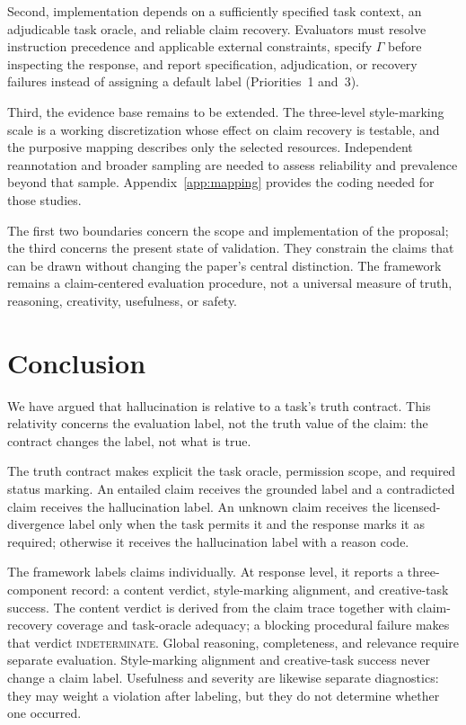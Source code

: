 \documentclass{clv2025}
\begin{document}
Second, implementation depends on a sufficiently specified task context, an
adjudicable task oracle, and reliable claim recovery. Evaluators must resolve
instruction precedence and applicable external constraints, specify $\Gamma$
before inspecting the response, and report specification, adjudication, or
recovery failures instead of assigning a default label (Priorities~1 and~3).

Third, the evidence base remains to be extended. The three-level style-marking
scale is a working discretization whose effect on claim recovery is testable,
and the purposive mapping describes only the selected resources. Independent
reannotation and broader sampling are needed to assess reliability and
prevalence beyond that sample. Appendix~\ref{app:mapping} provides the coding
needed for those studies.

The first two boundaries concern the scope and implementation of the proposal;
the third concerns the present state of validation. They constrain the claims
that can be drawn without changing the paper's central distinction. The
framework remains a claim-centered evaluation procedure, not a universal
measure of truth, reasoning, creativity, usefulness, or safety.


\section{Conclusion}\label{sec:conclusion}

We have argued that hallucination is relative to a task's truth contract.
This relativity concerns the evaluation label, not the truth value of the
claim: the contract changes the label, not what is true.

The truth contract makes explicit the task oracle, permission scope, and
required status marking.
An entailed claim receives the grounded label and a contradicted claim
receives the hallucination label.
An unknown claim receives the licensed-divergence label only when the task
permits it and the response marks it as required; otherwise it receives the
hallucination label with a reason code.

The framework labels claims individually. At response level, it reports a
three-component record: a content verdict, style-marking alignment, and
creative-task success. The content verdict is derived from the claim trace
together with claim-recovery coverage and task-oracle adequacy; a blocking
procedural failure makes that verdict \textsc{indeterminate}. Global reasoning,
completeness, and relevance require separate evaluation. Style-marking alignment
and creative-task success never change a claim label. Usefulness and severity
are likewise separate diagnostics: they may weight a violation after labeling,
but they do not determine whether one occurred.
\end{document}

